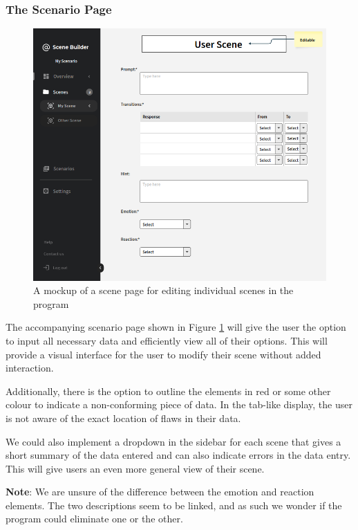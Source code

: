 \documentclass[sigart]{acmart_mod} %
\begin{document}
\subsubsection{The Scenario Page}
\begin{figure}
  \begin{center}
	\includegraphics[scale=0.4]{media/Scene_Page.png}
  \end{center}
\caption{A mockup of a scene page for editing individual scenes in the program}\label{fig2}
\end{figure}
The accompanying scenario page shown in Figure \ref{fig2} will give the user the option to input all necessary data and efficiently view all of their options. This will provide a visual interface for the user to modify their scene without added interaction.

Additionally, there is the option to outline the elements in red or some other colour to indicate a non-conforming piece of data. In the tab-like display, the user is not aware of the exact location of flaws in their data.

We could also implement a dropdown in the sidebar for each scene that gives a short summary of the data entered and can also indicate errors in the data entry. This will give users an even more general view of their scene.

\textbf{Note}: We are unsure of the difference between the emotion and reaction elements. The two descriptions seem to be linked, and as such we wonder if the program could eliminate one or the other.
\end{document}
